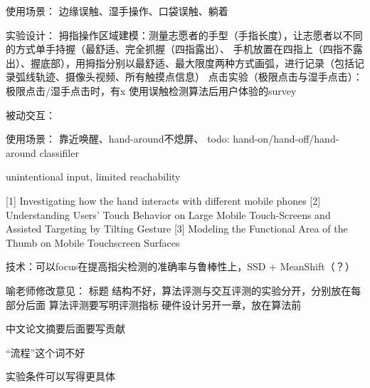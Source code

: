使用场景：
    边缘误触、湿手操作、口袋误触、躺着

实验设计：
    拇指操作区域建模：测量志愿者的手型（手指长度），让志愿者以不同的方式单手持握（最舒适、完全抓握（四指露出）、
    手机放置在四指上（四指不露出）、握底部），用拇指分别以最舒适、最大限度两种方式画弧，进行记录（包括记录弧线轨迹、摄像头视频、所有触摸点信息）
    点击实验（极限点击与湿手点击）：极限点击/湿手点击时，有x%
    使用误触检测算法后用户体验的survey

被动交互：

使用场景：
    靠近唤醒、hand-around不熄屏、
todo:
    hand-on/hand-off/hand-around classifiler



unintentional input, limited reachability
    

[1] Investigating how the hand interacts with different mobile phones
[2] Understanding Users’ Touch Behavior on Large Mobile Touch-Screens and Assisted Targeting by Tilting Gesture
[3] Modeling the Functional Area of the Thumb on Mobile Touchscreen Surfaces

技术：可以focus在提高指尖检测的准确率与鲁棒性上，SSD + MeanShift（？）

喻老师修改意见：
标题
结构不好，算法评测与交互评测的实验分开，分别放在每部分后面
算法评测要写明评测指标
硬件设计另开一章，放在算法前

中文论文摘要后面要写贡献

“流程”这个词不好

实验条件可以写得更具体